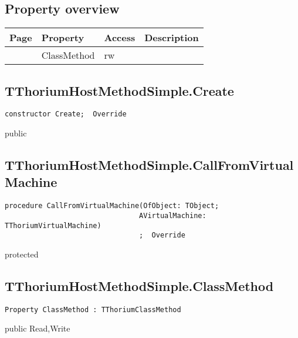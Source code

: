 \subsection{Property overview}
\label{thoriumcore:thorium:tthoriumhostmethodsimple:properties}
\begin{tabularx}{\textwidth}{lllX}
Page & Property & Access & Description \\ \hline
\pageref{thoriumcore:thorium:tthoriumhostmethodsimple:classmethod} & ClassMethod & rw &  \\
\hline
\end{tabularx}
\subsection{TThoriumHostMethodSimple.Create}
\label{thoriumcore:thorium:tthoriumhostmethodsimple:create}
\begin{FPCList}
\Synopsis
\Declaration 

\begin{verbatim}
constructor Create;  Override
\end{verbatim}
\Visibility
public
\Description
\Errors
\end{FPCList}
\subsection{TThoriumHostMethodSimple.CallFromVirtualMachine}
\label{thoriumcore:thorium:tthoriumhostmethodsimple:callfromvirtualmachine}
\begin{FPCList}
\Synopsis
\Declaration 

\begin{verbatim}
procedure CallFromVirtualMachine(OfObject: TObject;
                                AVirtualMachine: TThoriumVirtualMachine)
                                ;  Override
\end{verbatim}
\Visibility
protected
\Description
\Errors
\end{FPCList}
\subsection{TThoriumHostMethodSimple.ClassMethod}
\label{thoriumcore:thorium:tthoriumhostmethodsimple:classmethod}
\begin{FPCList}
\Synopsis
\Declaration 

\begin{verbatim}
Property ClassMethod : TThoriumClassMethod
\end{verbatim}
\Visibility
public
\Access
Read,Write
\Description
\end{FPCList}
